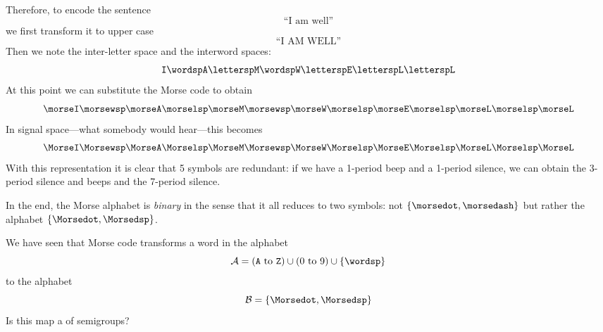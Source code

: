 \begin{example}
  Therefore, to encode the sentence
  \begin{equation}
  \text{``I am well''}
  \end{equation}
   we first transform it to upper case
   \begin{equation}
   \text{``I AM WELL''}
    \end{equation}
   Then we note the inter-letter space and the interword spaces:
  \begin{equation}
      \texttt{I} \wordsp \texttt{A} \lettersp \texttt{M} \wordsp \texttt{W} \lettersp
       \texttt{E} \lettersp \texttt{L} \lettersp \texttt{L}
  \end{equation}
  At this point we can substitute the Morse code to obtain
\begin{equation}
      \morseI \morsewsp \morseA \morselsp \morseM \morsewsp \morseW \morselsp \morseE \morselsp \morseL \morselsp \morseL
  \end{equation}
    In signal space---what somebody would hear---this becomes
\begin{equation}
      \MorseI \Morsewsp \MorseA \Morselsp \MorseM \Morsewsp \MorseW \Morselsp \MorseE \Morselsp \MorseL \Morselsp \MorseL
  \end{equation}
  With this representation it is clear that 5 symbols are redundant: if we have a 1-period beep and a 1-period silence, we can obtain the 3-period silence and beeps and the 7-period silence.

  In the end, the Morse alphabet is \emph{binary} in the sense that it all reduces to two symbols: not $\{\morsedot, \morsedash\}$ but rather the alphabet $\{\Morsedot, \Morsedsp\}$.

\end{example}

\begin{exercise}
We have seen that Morse code transforms a word in the alphabet
\begin{equation}
\mathcal{A} = (\texttt{A} \ \text{to}\ \texttt{Z}) \cup (0 \ \text{to}\ 9) \cup \{\wordsp\}
\end{equation}
to the alphabet
\begin{equation}
\mathcal{B} = \{\Morsedot, \Morsedsp\}
\end{equation}
Is this map a \whomo of semigroups?
\end{exercise}

\begin{example}
\end{example}


